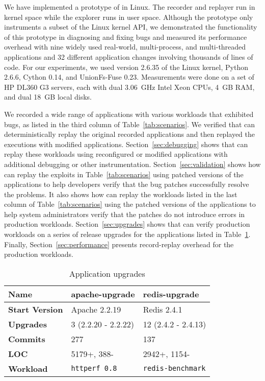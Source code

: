 We have implemented a prototype of {\dora} in Linux. The recorder and
replayer run in kernel space while the explorer runs in user space.
Although the prototype only instruments a subset of the Linux kernel API, we
demonstrated the functionality of this prototype in diagnosing
and fixing bugs and measured its performance overhead with nine
widely used real-world, multi-process, and multi-threaded applications
and 32 different application changes involving thousands of lines of code.
For our experiments, we used version 2.6.35 of the Linux kernel,
Python 2.6.6, Cython 0.14, and UnionFs-Fuse 0.23.
Measurements were done on a set of HP DL360 G3 servers, each with dual
3.06~GHz Intel Xeon CPUs, 4~GB RAM, and dual 18~GB local disks.

We recorded a wide
range of applications with various workloads that exhibited bugs,
as listed in the third
column of Table~\ref{tab:scenarios}.
We verified that {\dora} can
deterministically replay the original recorded applications and then
replayed the executions with modified applications.
Section~\ref{sec:debugging} shows that
{\dora} can replay these workloads using reconfigured or
modified applications with additional debugging or other
instrumentation. Section~\ref{sec:validation} shows
how {\dora} can replay the exploits in Table~\ref{tab:scenarios}
using patched versions of the applications to help developers
verify that the bug patches successfully resolve the problems.
It also shows how {\dora} can
replay the workloads listed in the last column of
Table~\ref{tab:scenarios} using the patched versions of the
applications to help system administrators verify that the patches
do not introduce errors in production workloads.
Section~\ref{sec:upgrades} shows that {\dora} can
verify production workloads on a series of release upgrades for the
applications listed in Table~\ref{tab:upgrades}.
Finally, Section~\ref{sec:performance} presents record-replay
overhead for the production workloads.

\begin{table}[t]
\begin{center}
\small
\begin{tabular}{|l|l|l|}   \hline
  {\bf Name} & apache-upgrade & redis-upgrade \\
\hline\hline
{\bf Start Version} & Apache 2.2.19 & Redis 2.4.1 \\
\hline
{\bf Upgrades} & 3 (2.2.20 - 2.2.22) & 12 (2.4.2 - 2.4.13) \\
\hline
{\bf Commits} & 277 & 137 \\
\hline
{\bf LOC} & 5179+, 388- & 2942+, 1154- \\
\hline
{\bf Workload} & {\tt httperf 0.8} & {\tt redis-benchmark} \\

\hline
\end{tabular}
\end{center}
\renewcommand\thetable{1}
\caption{Application upgrades}
\label{tab:upgrades}
\end{table}

